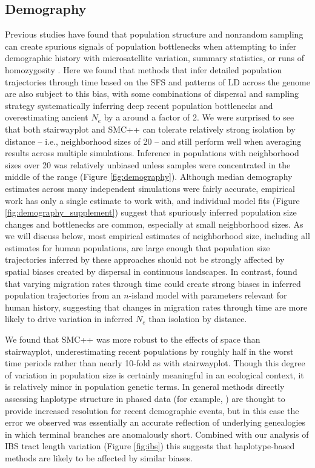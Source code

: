 \documentclass[10pt,twoside,lineno,hidelinks]{preprint}
\begin{document}
\subsection{Demography}

Previous studies have found that population structure and nonrandom sampling can create spurious signals of population bottlenecks when attempting to infer demographic history with microsatellite variation, summary statistics, or runs of homozygosity \citep{Chikhi2010,Stadler2009,Ptak2002,Mazet2015}. Here we found that methods that infer detailed population trajectories through time based on the SFS and patterns of LD across the genome are also subject to this bias, with some combinations of dispersal and sampling strategy systematically inferring deep recent population bottlenecks and overestimating ancient $N_{e}$ by a around a factor of 2. We were surprised to see that both stairwayplot and SMC++ can tolerate relatively strong isolation by distance -- i.e., neighborhood sizes of 20 -- and still perform well when averaging results across multiple simulations. Inference in populations with neighborhood sizes over 20 was relatively unbiased unless samples were concentrated in the middle of the range (Figure \ref{fig:demography}). 
Although median demography estimates across many independent simulations were fairly accurate,
empirical work has only a single estimate to work with,
and individual model fits (Figure \ref{fig:demography_supplement})
suggest that spuriously inferred population size changes and bottlenecks are common, especially at small neighborhood sizes.
As we will discuss below, most empirical estimates of neighborhood size, including all estimates for human populations, are large enough that population size trajectories inferred by these approaches should not be strongly affected by spatial biases created by dispersal in continuous landscapes. In contrast, \citet{Mazet2015} found that varying migration rates through time could create strong biases in inferred population trajectories from an $n$-island model with parameters relevant for human history, suggesting that changes in migration rates through time are more likely to drive variation in inferred $N_{e}$ than isolation by distance. 

We found that SMC++ was more robust to the effects of space than stairwayplot, underestimating recent populations by roughly half in the worst time periods rather than nearly 10-fold as with stairwayplot. Though this degree of variation in population size is certainly meaningful in an ecological context, it is relatively minor in population genetic terms.  In general methods directly assessing haplotype structure in phased data (for example, \citet{browning2015accurate}) are thought to provide increased resolution for recent demographic events, but in this case the error we observed was essentially an accurate reflection of underlying genealogies in which terminal branches are anomalously short. Combined with our analysis of IBS tract length variation (Figure \ref{fig:ibs}) this suggests that haplotype-based methods are likely to be affected by similar biases. 
\end{document}
